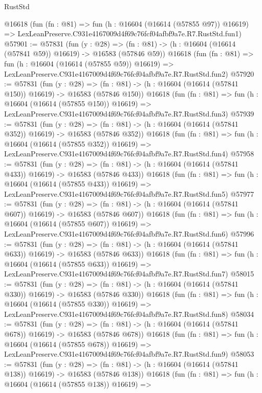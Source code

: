 \begin{lexlean}{RustStd}
\begin{coremodule}
    @16618
    (fun (fn : @81) =>
    fun (h : @16604 (@16614 (@57855 @97)) @16619) =>
    LexLeanPreserve.C931e4167009d4f69c76fcf04afbf9a7e.R7.RustStd.fun1)
@57901 := @57831
    (fun (y : @28) =>
    (fn : @81) -> (h : @16604 (@16614 (@57841 @59)) @16619) -> @16583 (@57846 @59))
    @16618
    (fun (fn : @81) =>
    fun (h : @16604 (@16614 (@57855 @59)) @16619) =>
    LexLeanPreserve.C931e4167009d4f69c76fcf04afbf9a7e.R7.RustStd.fun2)
@57920 := @57831
    (fun (y : @28) =>
    (fn : @81) -> (h : @16604 (@16614 (@57841 @150)) @16619) -> @16583 (@57846 @150))
    @16618
    (fun (fn : @81) =>
    fun (h : @16604 (@16614 (@57855 @150)) @16619) =>
    LexLeanPreserve.C931e4167009d4f69c76fcf04afbf9a7e.R7.RustStd.fun3)
@57939 := @57831
    (fun (y : @28) =>
    (fn : @81) -> (h : @16604 (@16614 (@57841 @352)) @16619) -> @16583 (@57846 @352))
    @16618
    (fun (fn : @81) =>
    fun (h : @16604 (@16614 (@57855 @352)) @16619) =>
    LexLeanPreserve.C931e4167009d4f69c76fcf04afbf9a7e.R7.RustStd.fun4)
@57958 := @57831
    (fun (y : @28) =>
    (fn : @81) -> (h : @16604 (@16614 (@57841 @433)) @16619) -> @16583 (@57846 @433))
    @16618
    (fun (fn : @81) =>
    fun (h : @16604 (@16614 (@57855 @433)) @16619) =>
    LexLeanPreserve.C931e4167009d4f69c76fcf04afbf9a7e.R7.RustStd.fun5)
@57977 := @57831
    (fun (y : @28) =>
    (fn : @81) -> (h : @16604 (@16614 (@57841 @607)) @16619) -> @16583 (@57846 @607))
    @16618
    (fun (fn : @81) =>
    fun (h : @16604 (@16614 (@57855 @607)) @16619) =>
    LexLeanPreserve.C931e4167009d4f69c76fcf04afbf9a7e.R7.RustStd.fun6)
@57996 := @57831
    (fun (y : @28) =>
    (fn : @81) -> (h : @16604 (@16614 (@57841 @633)) @16619) -> @16583 (@57846 @633))
    @16618
    (fun (fn : @81) =>
    fun (h : @16604 (@16614 (@57855 @633)) @16619) =>
    LexLeanPreserve.C931e4167009d4f69c76fcf04afbf9a7e.R7.RustStd.fun7)
@58015 := @57831
    (fun (y : @28) =>
    (fn : @81) -> (h : @16604 (@16614 (@57841 @330)) @16619) -> @16583 (@57846 @330))
    @16618
    (fun (fn : @81) =>
    fun (h : @16604 (@16614 (@57855 @330)) @16619) =>
    LexLeanPreserve.C931e4167009d4f69c76fcf04afbf9a7e.R7.RustStd.fun8)
@58034 := @57831
    (fun (y : @28) =>
    (fn : @81) -> (h : @16604 (@16614 (@57841 @678)) @16619) -> @16583 (@57846 @678))
    @16618
    (fun (fn : @81) =>
    fun (h : @16604 (@16614 (@57855 @678)) @16619) =>
    LexLeanPreserve.C931e4167009d4f69c76fcf04afbf9a7e.R7.RustStd.fun9)
@58053 := @57831
    (fun (y : @28) =>
    (fn : @81) -> (h : @16604 (@16614 (@57841 @138)) @16619) -> @16583 (@57846 @138))
    @16618
    (fun (fn : @81) =>
    fun (h : @16604 (@16614 (@57855 @138)) @16619) =>

\end{coremodule}
\end{lexlean}
